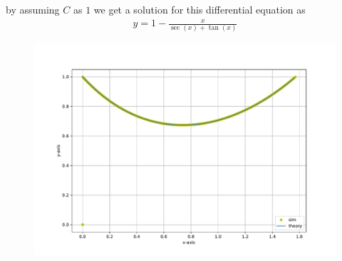 \documentclass[journal]{IEEEtran}
\begin{document}
by assuming $C$ as $1$ we get a solution for this differential equation as 
\begin{align}
y = 1 - \frac{x}{\sec(x)+\tan(x)}
\end{align}

\begin{figure}[h!]
   \centering
   \includegraphics[width=\columnwidth]{figs/combined_plot.pdf}
\end{figure}
\end{document}

